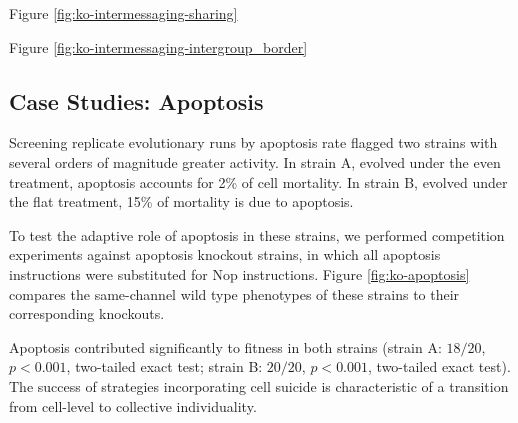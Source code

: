 Figure \ref{fig:ko-intermessaging-sharing}

Figure \ref{fig:ko-intermessaging-intergroup_border}

\subsection{Case Studies: Apoptosis} \label{sec:apoptosis}



Screening replicate evolutionary runs by apoptosis rate flagged two strains with several orders of magnitude greater activity.
In strain A, evolved under the even treatment, apoptosis accounts for 2\% of cell mortality.
In strain B, evolved under the flat treatment, 15\% of mortality is due to apoptosis.

To test the adaptive role of apoptosis in these strains, we performed competition experiments against apoptosis knockout strains, in which all apoptosis instructions were substituted for Nop instructions.
Figure \ref{fig:ko-apoptosis} compares the same-channel wild type phenotypes of these strains to their corresponding knockouts.

Apoptosis contributed significantly to fitness in both strains (strain A: $18/20$, $p < 0.001$, two-tailed exact test; strain B: $20/20$, $p < 0.001$, two-tailed exact test).
The success of strategies incorporating cell suicide is characteristic of a transition from cell-level to collective individuality.
